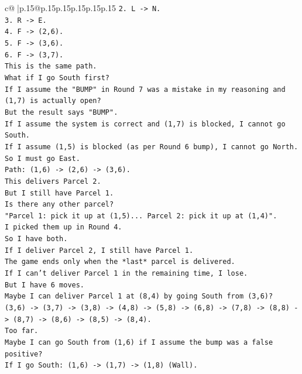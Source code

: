 \documentclass{article}
\begin{document}
{\begin{supertabular}{c@{$\;$}|p{.15\linewidth}@{}p{.15\linewidth}p{.15\linewidth}p{.15\linewidth}p{.15\linewidth}p{.15\linewidth}}
{{{\texttt{2. L {-}> N.} \\
\texttt{3. R {-}> E.} \\
\texttt{4. F {-}> (2,6).} \\
\texttt{5. F {-}> (3,6).} \\
\texttt{6. F {-}> (3,7).} \\
\texttt{This is the same path.} \\
\texttt{What if I go South first?} \\
\texttt{If I assume the "BUMP" in Round 7 was a mistake in my reasoning and (1,7) is actually open?} \\
\texttt{But the result says "BUMP".} \\
\texttt{If I assume the system is correct and (1,7) is blocked, I cannot go South.} \\
\texttt{If I assume (1,5) is blocked (as per Round 6 bump), I cannot go North.} \\
\texttt{So I must go East.} \\
\texttt{Path: (1,6) {-}> (2,6) {-}> (3,6).} \\
\texttt{This delivers Parcel 2.} \\
\texttt{But I still have Parcel 1.} \\
\texttt{Is there any other parcel?} \\
\texttt{"Parcel 1: pick it up at (1,5)... Parcel 2: pick it up at (1,4)".} \\
\texttt{I picked them up in Round 4.} \\
\texttt{So I have both.} \\
\texttt{If I deliver Parcel 2, I still have Parcel 1.} \\
\texttt{The game ends only when the *last* parcel is delivered.} \\
\texttt{If I can't deliver Parcel 1 in the remaining time, I lose.} \\
\texttt{But I have 6 moves.} \\
\texttt{Maybe I can deliver Parcel 1 at (8,4) by going South from (3,6)?} \\
\texttt{(3,6) {-}> (3,7) {-}> (3,8) {-}> (4,8) {-}> (5,8) {-}> (6,8) {-}> (7,8) {-}> (8,8) {-}> (8,7) {-}> (8,6) {-}> (8,5) {-}> (8,4).} \\
\texttt{Too far.} \\
\texttt{Maybe I can go South from (1,6) if I assume the bump was a false positive?} \\
\texttt{If I go South: (1,6) {-}> (1,7) {-}> (1,8) (Wall).} \\
}}}
\end{supertabular}}
\end{document}
